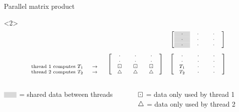 \documentclass[14pt]{beamer}
\begin{document}
\begin{frame}{Parallel matrix product}
\begin{onlyenv}
\begin{onlyenv}<2>
\[
\scriptsize
\begin{array}{ccc}
&& \left[\begin{array}{ccc}
\ \ \cl{\cdot} \ \ & \ \ \cdot \ \  & \ \ \cdot \ \ \\
\ \ \cl{\cdot} \ \ & \ \ \cdot \ \  & \ \ \cdot \ \ \\
\ \ \cl{\cdot} \ \ & \ \ \cdot \ \  & \ \ \cdot \ \ \\
\end{array}\right]\\
\\
\begin{array}{r}
\\
\\
\text{thread 1 computes }T_1 \ \ \ \ \rw\\
\text{thread 2 computes }T_2 \ \ \ \ \rw\\
\end{array}
& \left[\begin{array}{ccc}
\ \ \cdot \ \ & \ \ \cdot \ \  & \ \ \cdot \ \ \\
\ \ \cdot \ \ & \ \ \cdot \ \  & \ \ \cdot \ \ \\
\bd & \bd & \bd \\
\uptri & \uptri & \uptri \\
\end{array}\right]
& \left[\begin{array}{ccc}
\ \ \cdot \ \ & \ \ \cdot \ \  & \ \ \cdot \ \ \\
\ \ \cdot \ \ & \ \ \cdot \ \  & \ \ \cdot \ \ \\
\ T_1 \ & \ \ \cdot \ \  & \ \ \cdot \ \ \\
\ T_2 \ & \ \ \cdot \ \  & \ \ \cdot \ \ \\
\end{array}\right]
\end{array}
\]
\end{onlyenv}

\vspace{0.3cm}

\begin{columns}
\begin{column}{0.5\textwidth}
\footnotesize
$\scriptsize\begin{array}{c}\cl{\ \ \ }\end{array}$ = shared data between threads
\end{column}
\begin{column}{0.5\textwidth}
\footnotesize
$\boxdot$ = data only used by thread 1\\
$\bigtriangleup$ = data only used by thread 2
\end{column}
\end{columns}
\end{onlyenv}


\end{frame}
\end{document}
